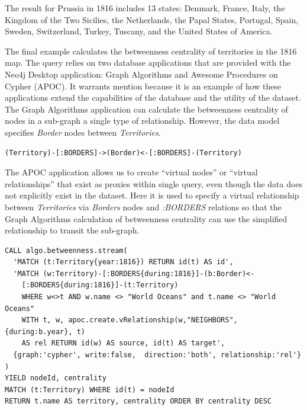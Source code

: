 \documentclass[runningheads]{llncs}
\begin{document}
The result for Prussia in 1816 includes 13 states: Denmark, France, Italy, the Kingdom of the Two Sicilies, the Netherlands, the Papal States, Portugal, Spain, Sweden, Switzerland, Turkey, Tuscany, and the United States of America. 

The final example calculates the betweenness centrality of territories in the 1816 map.
The query relies on two database applications that are provided with the Neo4j Desktop application: Graph Algorithms and Awesome Procedures on Cypher (APOC).
It warrants mention because it is an example of how these applications extend the capabilities of the database and the utility of the dataset.
The Graph Algorithms application can calculate the betweenness centrality of nodes in a sub-graph a single type of relationship.
However, the data model specifies \textit{Border} nodes between \textit{Territories}.

\begin{lstlisting}[caption={Territories and Borders data model.}, label={lst:model}]
(Territory)-[:BORDERS]->(Border)<-[:BORDERS]-(Territory)
\end{lstlisting}

The APOC application allows us to create ``virtual nodes'' or ``virtual relationships'' that exist as proxies within single query, even though the data does not explicitly exist in the dataset. 
Here it is used to specify a virtual relationship between \textit{Territories} via \textit{Borders} nodes and \textit{:BORDERS} relations so that the Graph Algorithms calculation of betweenness centrality can use the simplified relationship to transit the sub-graph. 

\begin{lstlisting}[caption={Query example with graph algorithm predicated on virtual relationship.}, label={lst:algo}]
CALL algo.betweenness.stream(
  'MATCH (t:Territory{year:1816}) RETURN id(t) AS id',
  'MATCH (w:Territory)-[:BORDERS{during:1816}]-(b:Border)<-
    [:BORDERS{during:1816}]-(t:Territory)  
    WHERE w<>t AND w.name <> "World Oceans" and t.name <> "World Oceans" 
    WITH t, w, apoc.create.vRelationship(w,"NEIGHBORS", {during:b.year}, t) 
    AS rel RETURN id(w) AS source, id(t) AS target',
  {graph:'cypher', write:false,  direction:'both', relationship:'rel'}
)
YIELD nodeId, centrality
MATCH (t:Territory) WHERE id(t) = nodeId
RETURN t.name AS territory, centrality ORDER BY centrality DESC
\end{lstlisting}
\end{document}
